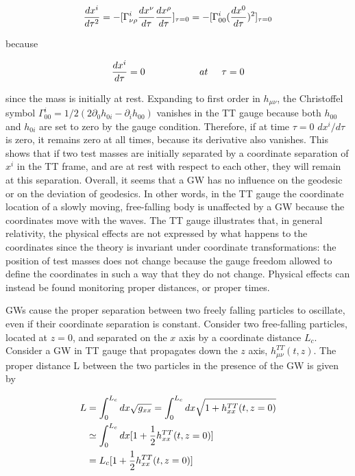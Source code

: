 \documentclass[binding=0.6cm, LaM]{sapthesis}
\begin{document}
		\begin{equation}
		{{dx^i}\over{d\tau^2}} = -[\Gamma^i_{\nu\rho}{{dx^{\nu}}\over{d\tau}}{{dx^{\rho}}\over{d\tau}}]_{\tau=0} \\ 
		= - [ \Gamma^i_{00}({{dx^0}\over{d\tau}})^2]_{\tau=0}
		\end{equation}

	because

		\begin{equation}
		{{dx^i}\over{d\tau}} = 0 \hspace*{2cm} at \hspace*{0.5cm}\tau = 0
		\end{equation}

	since the mass is initially at rest. Expanding to first order in $h_{\mu\nu}$, 
	the Christoffel symbol $\Gamma^i_{00} = 1/2(2\partial_{0}h_{0i} - \partial_i h_{00})$ vanishes in the TT gauge
	because both $h_{00}$ and $h_{0i}$ are set to zero by the gauge condition. 
	Therefore, if at time $\tau = 0$ $dx^i/d\tau$ is zero, it remains zero at all times, 
	because its derivative also vanishes.
	This shows that if two test masses are initially separated by a coordinate separation of $x^i$ in the TT frame, 
	and are at rest with respect to each other, they will remain at this separation. 
	Overall, it seems that a GW has no influence on the geodesic or on the deviation of geodesics.
	In other words, in the TT gauge the coordinate location of a slowly moving, free-falling body is unaffected 
	by a GW because the coordinates move with the waves.
	The TT gauge illustrates that, in general relativity, the physical effects are not expressed by what happens 
	to the coordinates since the theory is invariant under coordinate transformations:
	the position of test masses does not change because the gauge freedom allowed to define the coordinates 
	in such a way that they do not change.
	Physical effects can instead be found monitoring proper distances, or proper times.

	GWs cause the proper separation between two freely falling particles to oscillate, 
	even if their coordinate separation is constant. Consider two  free-falling particles, 
	located at $z = 0$, and separated on the $x$ axis by a coordinate distance $L_c$. \\
	Consider a GW in TT gauge that propagates down the $z$ axis, $h^{TT}_{\mu\nu}(t,z)$. 
	The proper distance L between the two particles in the presence of the GW is given by

		\begin{align}
		\label{distance}
		L & = \int^{L_c}_{0}{dx\sqrt{g_{xx}}} = \int^{L_c}_{0}dx\sqrt{1 + h^{TT}_{xx}(t,z=0)} \\
		& \simeq \int^{L_c}_{0}{dx[1 + {1 \over 2}h^{TT}_{xx}(t,z=0)]} \\
		&= L_c[1 + {1 \over 2}h^{TT}_{xx}(t,z=0)]
		\end{align}
\end{document}
